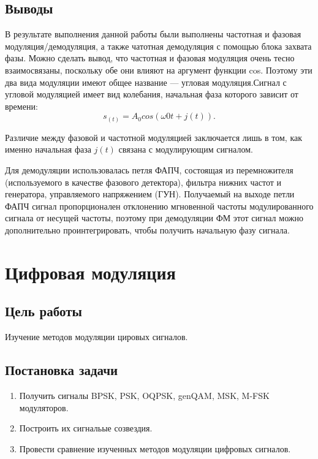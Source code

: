 \documentclass[10pt,a4paper]{article}
\begin{document}
\subsection{Выводы}
В результате выполнения данной работы были выполнены частотная и фазовая модуляция/демодуляция, а также чатотная демодуляция с  помощью блока захвата фазы. Можно сделать вывод, что частотная и фазовая модуляция очень тесно взаимосвязаны, поскольку обе они влияют на аргумент функции cos. Поэтому эти два вида модуляции имеют общее название — угловая модуляция.Сигнал с угловой модуляцией имеет вид колебания, начальная фаза которого зависит от времени:
	\begin{equation}
	s_(t) = A_0 cos(\omega0 t + j(t)).
	\end{equation}

Различие между фазовой и частотной модуляцией заключается лишь в том, как именно начальная фаза $j(t)$ связана с модулирующим сигналом.

Для демодуляции использовалась петля ФАПЧ, состоящая из перемножителя (используемого в качестве фазового детектора), фильтра нижних частот и генератора, управляемого напряжением (ГУН). Получаемый на выходе петли ФАПЧ сигнал пропорционален отклонению мгновенной частоты модулированного сигнала от несущей частоты, поэтому при демодуляции ФМ этот сигнал можно дополнительно проинтегрировать, чтобы получить начальную фазу сигнала.

\newpage
\section{Цифровая модуляция}

\subsection{Цель работы}
Изучение методов модуляции цировых сигналов.

\subsection{Постановка задачи}
	\begin{enumerate}
		\item Получить сигналы BPSK, PSK, OQPSK, genQAM, MSK, M-FSK модуляторов.
		\item Построить их сигнальые созвездия.
		\item Провести сравнение изученных методов модуляции цифровых сигналов.
	\end{enumerate}
\end{document}
